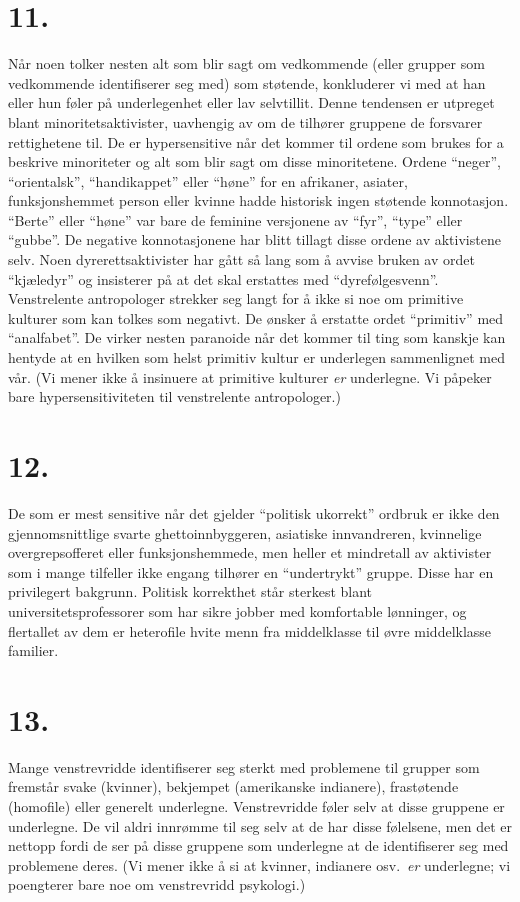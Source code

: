 \documentclass[oneside]{book}
\begin{document}
\section*{11.}
Når noen tolker nesten alt som blir sagt om vedkommende (eller grupper som
vedkommende identifiserer seg med) som støtende, konkluderer vi med at han
eller hun føler på underlegenhet eller lav selvtillit. Denne tendensen er
utpreget blant minoritetsaktivister, uavhengig av om de tilhører gruppene de
forsvarer rettighetene til. De er hypersensitive når det kommer til ordene som
brukes for a beskrive minoriteter og alt som blir sagt om disse minoritetene.
Ordene ``neger'', ``orientalsk'', ``handikappet'' eller ``høne'' for en
afrikaner, asiater, funksjonshemmet person eller kvinne hadde historisk ingen
støtende konnotasjon. ``Berte'' eller ``høne'' var bare de feminine versjonene
av ``fyr'', ``type'' eller ``gubbe''. De negative konnotasjonene har blitt
tillagt disse ordene av aktivistene selv. Noen dyrerettsaktivister har gått så
lang som å avvise bruken av ordet ``kjæledyr'' og insisterer på at det skal
erstattes med ``dyrefølgesvenn''. Venstrelente antropologer strekker seg langt
for å ikke si noe om primitive kulturer som kan tolkes som negativt. De ønsker
å erstatte ordet ``primitiv'' med ``analfabet''. De virker nesten paranoide når
det kommer til ting som kanskje kan hentyde at en hvilken som helst primitiv
kultur er underlegen sammenlignet med vår. (Vi mener ikke å insinuere at
primitive kulturer \emph{er} underlegne. Vi påpeker bare hypersensitiviteten til
venstrelente antropologer.)

\section*{12.}
De som er mest sensitive når det gjelder ``politisk ukorrekt'' ordbruk er ikke
den gjennomsnittlige svarte ghettoinnbyggeren, asiatiske innvandreren,
kvinnelige overgrepsofferet eller funksjonshemmede, men heller et mindretall av
aktivister som i mange tilfeller ikke engang tilhører en ``undertrykt'' gruppe.
Disse har en privilegert bakgrunn. Politisk korrekthet står sterkest blant
universitetsprofessorer som har sikre jobber med komfortable lønninger, og
flertallet av dem er heterofile hvite menn fra middelklasse til øvre
middelklasse familier.

\section*{13.}
Mange venstrevridde identifiserer seg sterkt med problemene til grupper som
fremstår svake (kvinner), bekjempet (amerikanske indianere), frastøtende
(homofile) eller generelt underlegne. Venstrevridde føler selv at disse
gruppene er underlegne. De vil aldri innrømme til seg selv at de har disse
følelsene, men det er nettopp fordi de ser på disse gruppene som underlegne at
de identifiserer seg med problemene deres. (Vi mener ikke å si at kvinner,
indianere osv.\ \emph{er} underlegne; vi poengterer bare noe om venstrevridd
psykologi.)
\end{document}
